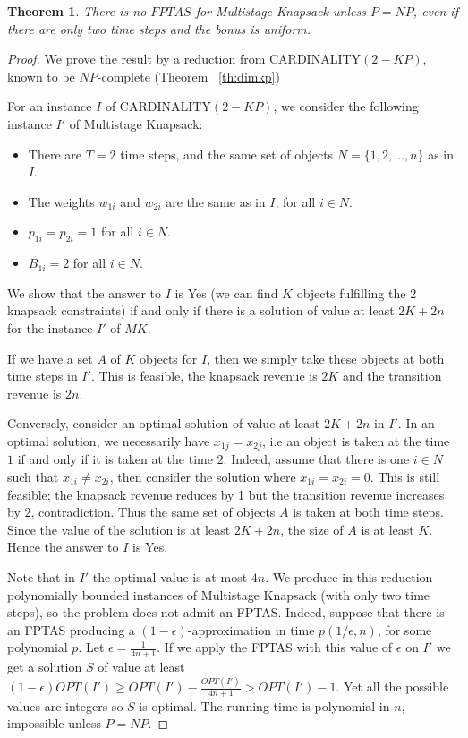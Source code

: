 \documentclass[a4paper]{book}
\newtheorem{theorem}{Theorem}[chapter]
\newtheorem{proof}{\noindent{\bf Proof.} }
\begin{document}
\begin{theorem}\label{thnofptas}
There is no $FPTAS$ for {\sc Multistage Knapsack} unless $P=NP$, even if there are only two time steps and the bonus is uniform.
\end{theorem}
\begin{proof}
We prove the result by a reduction from CARDINALITY$(2-KP)$, known to be $NP$-complete (Theorem~ \ref{th:dimkp}) 

For an instance $I$ of CARDINALITY$(2-KP)$, we consider the following instance $I'$ of {\sc Multistage  Knapsack}: \\
\begin{itemize}
\item There are $T=2$ time steps, and the same set of objects $N=\{1,2,...,n\}$ as in $I$.
\item The weights $w_{1i}$ and $w_{2i}$ are the same as in $I$, for all $i \in N$.
\item $p_{1i}=p_{2i}=1$ for all $i \in N$.
\item $B_{1i}=2$ for all $i\in N$.
\end{itemize}

We show that the answer to $I$ is Yes (we can find $K$ objects fulfilling the 2 knapsack constraints) if and only if there is a solution of value at least $2K+2n$ for the instance $I'$ of $MK$.

If we have a set $A$ of $K$ objects for $I$, then we simply take these objects at both time steps in $I'$. This is feasible, the knapsack revenue is $2K$ and the transition revenue is $2n$.

Conversely, consider an optimal solution of value at least $2K+2n$ in $I'$. In an optimal solution, we necessarily have $x_{1j}=x_{2j}$, i.e an object is taken at the time $1$ if and only if it is taken at the time $2$. Indeed, assume that there is one $i \in N$ such that $x_{1i} \neq x_{2i}$, then consider the solution where $x_{1i} = x_{2i}=0$. This is still feasible; the knapsack revenue reduces by 1 but the transition revenue increases by $2$, contradiction.
Thus the same set of objects $A$ is taken at both time steps. Since the value of the solution is at least $2K+2n$, the size of $A$ is at least $K$. Hence the answer to $I$ is Yes.

Note that in $I'$ the optimal value is at most $4n$. We produce in this reduction polynomially bounded instances of {\sc Multistage  Knapsack} (with only two time steps), so the problem does not admit an FPTAS. Indeed, suppose that there is an FPTAS producing a $(1-\epsilon)$-approximation in time $p(1/\epsilon,n)$, for some polynomial $p$. Let $\epsilon = \frac{1}{4n+1}$. If we apply the FPTAS with this value of $\epsilon$ on $I'$ we get a solution $S$ of value at least  $(1-\epsilon)OPT(I')\geq OPT(I') - \frac{OPT(I')}{4n+1} > OPT(I')-1$. Yet all the possible values are integers so $S$ is optimal. The running time is polynomial in $n$, impossible unless $P=NP$.
\end{proof} 
\end{document}
